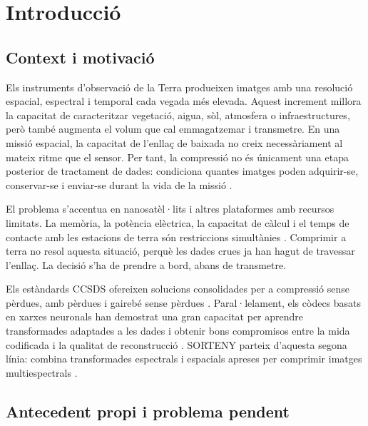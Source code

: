 \chapter{Introducció}\label{ch:introduccio}
\fancyhead[LO]{\slshape \textsf{\nouppercase \rightmark}}

\section{Context i motivació}\label{sec:context}

Els instruments d'observació de la Terra produeixen imatges amb una resolució
espacial, espectral i temporal cada vegada més elevada. Aquest increment
millora la capacitat de caracteritzar vegetació, aigua, sòl, atmosfera o
infraestructures, però també augmenta el volum que cal emmagatzemar i
transmetre. En una missió espacial, la capacitat de l'enllaç de baixada no
creix necessàriament al mateix ritme que el sensor. Per tant, la compressió no
és únicament una etapa posterior de tractament de dades: condiciona quantes
imatges poden adquirir-se, conservar-se i enviar-se durant la vida de la
missió \cite{blanes2014tutorial,bioucas2013hyperspectral,denis2017disruptions}.

El problema s'accentua en nanosatèl·lits i altres plataformes amb recursos
limitats. La memòria, la potència elèctrica, la capacitat de càlcul i el temps
de contacte amb les estacions de terra són restriccions simultànies
\cite{selva2012cubesats,nasa2017cubesat}. Comprimir a terra no resol aquesta
situació, perquè les dades crues ja han hagut de travessar l'enllaç. La decisió
s'ha de prendre a bord, abans de transmetre.

Els estàndards CCSDS ofereixen solucions consolidades per a compressió sense
pèrdues, amb pèrdues i gairebé sense pèrdues
\cite{ccsds121,ccsds122,ccsds1221,ccsds123}. Paral·lelament, els còdecs basats
en xarxes neuronals han demostrat una gran capacitat per aprendre transformades
adaptades a les dades i obtenir bons compromisos entre la mida codificada i la
qualitat de reconstrucció
\cite{balle2017end,balle2018hyperprior,mijares2023reduced}. SORTENY parteix
d'aquesta segona línia: combina transformades espectrals i espacials apreses
per comprimir imatges multiespectrals \cite{mijares2025sorteny}.

\section{Antecedent propi i problema pendent}\label{sec:antecedent_intro}

